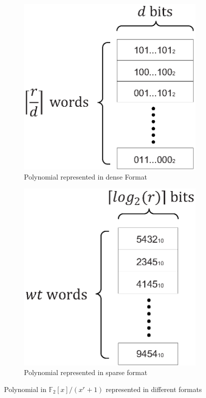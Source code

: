 \documentclass[runningheads]{llncs}
\begin{document}
\begin{figure}[!tb]
\centering
\begin{subfigure}[t]{0.43\textwidth}\centering
\includegraphics[width=\textwidth]{./fig/PolyDenseFormat.eps}
\caption{Polynomial represented in dense Format}
\label{fig:poly_dense}
\end{subfigure}
\hspace{1em}
\begin{subfigure}[t]{0.43\textwidth}\centering
\includegraphics[width=\textwidth]{./fig/PolySparseFormat.eps}
\caption{Polynomial represented in sparse format}
\label{fig:poly_sparse}
\end{subfigure}
\caption{Polynomial in $\mathbb{F}_2[x]/(x^r+1)$ represented in different formats}
\label{fig::shifter}
\end{figure}
\end{document}
